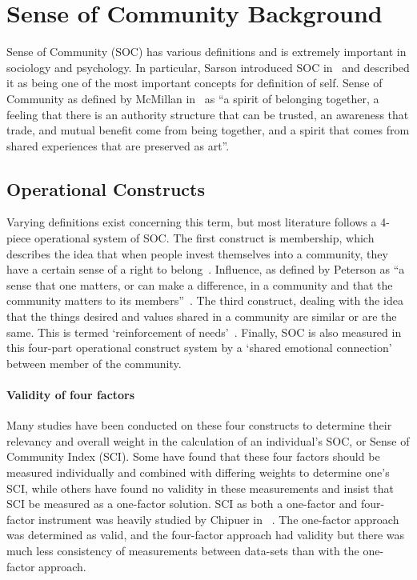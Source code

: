 \documentclass{sig-alternate}
\begin{document}
\section{Sense of Community Background}
\label{sec:background}
Sense of Community (SOC) has various definitions and is extremely important in sociology and psychology. In particular, Sarson introduced SOC in~\cite{sarson:1974} and described it as being one of the most important concepts for definition of self. Sense of Community as defined by McMillan in~\cite{senseOfCommunity:1996} as ``a spirit of belonging together, a feeling that there is an authority structure that can be trusted, an awareness that trade, and mutual benefit come from being together, and a spirit that comes from shared experiences that are preserved as art''. 
\subsection{Operational Constructs}
Varying definitions exist concerning this term, but most literature follows a 4-piece operational system of SOC. The first construct is membership, which describes the idea that when people invest themselves into a community, they have a certain sense of a right to belong~\cite{definition:1986}. Influence, as defined by Peterson as ``a sense that one matters, or can make a difference, in a
community and that the community matters to its members''~\cite{fourFactor:2008}. The third construct, dealing with the idea that the things desired and values shared in a community are similar or are the same. This is termed `reinforcement of needs'~\cite{disparities:2009}. Finally, SOC is also measured in this four-part operational construct system by a `shared emotional connection' between member of the community. 
\paragraph{Validity of four factors}
Many studies have been conducted on these four constructs to determine their relevancy and overall weight in the calculation of an individual's SOC, or Sense of Community Index (SCI). Some have found that these four factors should be measured individually and combined with differing weights to determine one's SCI, while others have found no validity in these measurements and insist that SCI be measured as a one-factor solution. SCI as both a one-factor and four-factor instrument was heavily studied by Chipuer in ~\cite{oneFactor:1999}. The one-factor approach was determined as valid, and the four-factor approach had validity but there was much less consistency of measurements between data-sets than with the one-factor approach.
\end{document}
